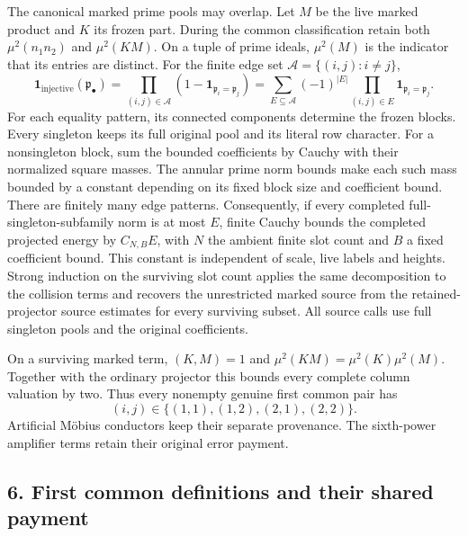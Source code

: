The canonical marked prime pools may overlap. Let \(M\) be the live marked
product and \(K\) its frozen part. During the common classification retain
both \(\mu^2(n_1n_2)\) and \(\mu^2(KM)\). On a tuple of prime ideals,
\(\mu^2(M)\) is the indicator that its entries are distinct. For the finite
edge set \(\mathcal A=\{(i,j):i\ne j\}\),
\[
 \mathbf1_{\mathrm{injective}}(\mathfrak p_\bullet)
 =\prod_{(i,j)\in\mathcal A}
       (1-\mathbf1_{\mathfrak p_i=\mathfrak p_j})
 =\sum_{E\subseteq\mathcal A}(-1)^{|E|}
       \prod_{(i,j)\in E}\mathbf1_{\mathfrak p_i=\mathfrak p_j}.
 \tag{10a}
\]
For each equality pattern, its connected components determine the frozen
blocks. Every singleton keeps its full original pool and its literal
row character. For a nonsingleton block, sum the bounded coefficients by
Cauchy with their normalized square masses. The annular prime norm bounds
make each such mass bounded by a constant depending on its fixed block
size and coefficient bound. There are finitely many edge patterns.
Consequently, if every completed full-singleton-subfamily norm is at most
\(E\), finite Cauchy bounds the completed projected energy by
\(C_{N,B}E\), with \(N\) the ambient finite slot count and \(B\) a fixed
coefficient bound. This constant is independent of scale, live labels and
heights. Strong induction on the surviving slot count applies the same
decomposition to the collision terms and recovers the unrestricted
marked source from the retained-projector source estimates for every
surviving subset. All source calls use full singleton pools and the
original coefficients.

On a surviving marked term, \((K,M)=1\) and
\(\mu^2(KM)=\mu^2(K)\mu^2(M)\). Together with the ordinary projector this
bounds every complete column valuation by two. Thus every nonempty
genuine first common pair has
\[
 (i,j)\in\{(1,1),(1,2),(2,1),(2,2)\}.\tag{10}
\]
Artificial M\"obius conductors keep their separate provenance. The
sixth-power amplifier terms retain their original error payment.

\hypertarget{sources:first-common-definitions-and-their-shared-payment}{%
\subsection{6. First common definitions and their shared payment}\label{sources:first-common-definitions-and-their-shared-payment}}

